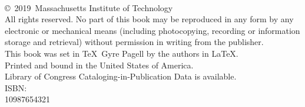 \thispagestyle{empty}
\begin{fullwidth}
\vfill
\noindent\\[3in]
\copyright\ 2019\ Massachusetts Institute of
Technology\\[0.2in]
All rights reserved. No part of this book may be reproduced in any
form by any electronic or mechanical means (including photocopying,
recording or information storage and retrieval)
without permission in writing from the publisher.\\[0.2in]
This book was set in \TeX\ Gyre Pagell by the authors in \LaTeX.\\
Printed and bound in the United States of America.\\[0.2in]
Library of Congress Cataloging-in-Publication Data is available.\\[0.2in]
ISBN: \\[0.2in]
 10\hspace{1em}9\hspace{1em}8\hspace{1em}7\hspace{1em}6\hspace{1em}5\hspace{1em}4\hspace{1em}3\hspace{1em}2\hspace{1em}1
\end{fullwidth}

\clearpage
